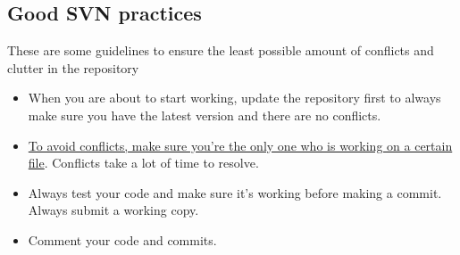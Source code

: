 \documentclass[a4paper,10pt]{article}
\begin{document}
    \subsection{Good SVN practices}
        These are some guidelines to ensure the least possible amount of conflicts and clutter in the repository
        \begin{itemize}
            \item When you are about to start working, update the repository first to always make sure you have the latest version and there are no conflicts.
            \item \underline{To avoid conflicts, make sure you're the only one who is working on a certain file}. Conflicts take a lot of time to resolve.
            \item Always test your code and make sure it's working before making a commit. Always submit a working copy.
            \item Comment your code and commits.
        \end{itemize}
    
    
\end{document}
